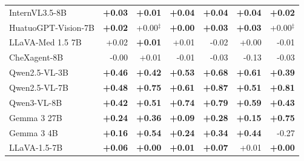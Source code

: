 \documentclass{article}
\begin{document}
\begin{table}[htbp]
{\begin{tabular}{lrrrrrr}
InternVL3.5-8B & \cellcolor{cfTerra2}\textbf{+0.03} & \cellcolor{cfTerra1}\textbf{+0.01} & \cellcolor{cfTerra2}\textbf{+0.04} & \cellcolor{cfTerra2}\textbf{+0.04} & \cellcolor{cfTerra2}\textbf{+0.04} & \cellcolor{cfTerra1}\textbf{+0.02} \\
HuatuoGPT-Vision-7B & \cellcolor{cfTerra1}\textbf{+0.02} & \cellcolor{cfTerra1}+0.00$^{\ddagger}$ & \cellcolor{cfTerra1}\textbf{+0.00} & \cellcolor{cfTerra2}\textbf{+0.03} & \cellcolor{cfTerra2}\textbf{+0.03} & \cellcolor{cfTerra1}+0.00$^{\ddagger}$ \\
LLaVA-Med 1.5 7B & \cellcolor{cfTerra1}+0.02 & \cellcolor{cfTerra1}\textbf{+0.01} & \cellcolor{cfTerra1}+0.01 & \cellcolor{cfSlate2}-0.02 & \cellcolor{cfTerra1}+0.00 & \cellcolor{cfSlate1}-0.01 \\
CheXagent-8B & \cellcolor{cfSlate1}-0.00 & \cellcolor{cfTerra1}+0.01 & \cellcolor{cfSlate1}-0.01 & \cellcolor{cfSlate2}-0.03 & \cellcolor{cfSlate3}-0.13 & \cellcolor{cfSlate2}-0.03 \\
Qwen2.5-VL-3B & \cellcolor{cfTerra4}\textbf{+0.46} & \cellcolor{cfTerra4}\textbf{+0.42} & \cellcolor{cfTerra4}\textbf{+0.53} & \cellcolor{cfTerra4}\textbf{+0.68} & \cellcolor{cfTerra4}\textbf{+0.61} & \cellcolor{cfTerra4}\textbf{+0.39} \\
Qwen2.5-VL-7B & \cellcolor{cfTerra4}\textbf{+0.48} & \cellcolor{cfTerra4}\textbf{+0.75} & \cellcolor{cfTerra4}\textbf{+0.61} & \cellcolor{cfTerra4}\textbf{+0.87} & \cellcolor{cfTerra4}\textbf{+0.51} & \cellcolor{cfTerra4}\textbf{+0.81} \\
Qwen3-VL-8B & \cellcolor{cfTerra4}\textbf{+0.42} & \cellcolor{cfTerra4}\textbf{+0.51} & \cellcolor{cfTerra4}\textbf{+0.74} & \cellcolor{cfTerra4}\textbf{+0.79} & \cellcolor{cfTerra4}\textbf{+0.59} & \cellcolor{cfTerra4}\textbf{+0.43} \\
Gemma 3 27B & \cellcolor{cfTerra3}\textbf{+0.24} & \cellcolor{cfTerra4}\textbf{+0.36} & \cellcolor{cfTerra2}\textbf{+0.09} & \cellcolor{cfTerra4}\textbf{+0.28} & \cellcolor{cfTerra3}\textbf{+0.15} & \cellcolor{cfTerra4}\textbf{+0.75} \\
Gemma 3 4B & \cellcolor{cfTerra3}\textbf{+0.16} & \cellcolor{cfTerra4}\textbf{+0.54} & \cellcolor{cfTerra3}\textbf{+0.24} & \cellcolor{cfTerra4}\textbf{+0.34} & \cellcolor{cfTerra4}\textbf{+0.44} & \cellcolor{cfSlate4}-0.27 \\
LLaVA-1.5-7B & \cellcolor{cfTerra2}\textbf{+0.06} & \cellcolor{cfTerra1}\textbf{+0.00} & \cellcolor{cfTerra1}\textbf{+0.01} & \cellcolor{cfTerra2}\textbf{+0.07} & \cellcolor{cfTerra1}+0.01 & \cellcolor{cfTerra1}\textbf{+0.00} \\

\end{tabular}}
\end{table}
\end{document}
